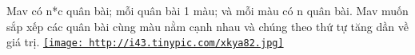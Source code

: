 Mav có n*c quân bài; mỗi quân bài 1 màu; và mỗi màu có n quân bài. Mav  muốn sắp xếp các quân bài cùng màu nằm cạnh nhau và chúng theo thứ tự  tăng dần về giá trị.  \href{http://tinypic.com}{
\texttt{[image: http://i43.tinypic.com/xkya82.jpg]}}

\